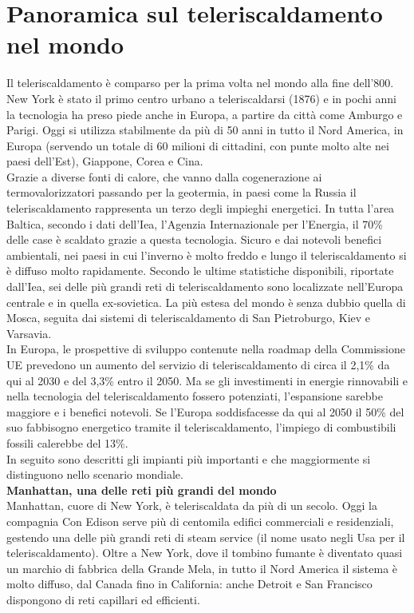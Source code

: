 \documentclass[laurea,oneside,11pt]{USiena_tesiLM}
\begin{document}
\section{Panoramica sul teleriscaldamento nel mondo}
Il teleriscaldamento è comparso per la prima volta nel mondo alla fine dell'800. New York è stato il primo centro urbano a teleriscaldarsi (1876) e in pochi anni la tecnologia ha preso piede anche in Europa, a partire da città come Amburgo e Parigi.
Oggi si utilizza stabilmente da più di 50 anni in tutto il Nord America, in Europa (servendo un totale di 60 milioni di cittadini, con punte molto alte nei paesi dell'Est), Giappone, Corea e Cina.\\

Grazie a diverse fonti di calore, che vanno dalla cogenerazione ai termovalorizzatori passando per la geotermia, in paesi come la Russia il teleriscaldamento rappresenta un terzo degli impieghi energetici. In tutta l'area Baltica, secondo i dati dell'Iea, l'Agenzia Internazionale per l'Energia, il 70\% delle case è scaldato grazie a questa tecnologia. Sicuro e dai notevoli benefici ambientali, nei paesi in cui l'inverno è molto freddo e lungo il teleriscaldamento si è diffuso molto rapidamente. Secondo le ultime statistiche disponibili, riportate dall'Iea, sei delle più grandi reti di teleriscaldamento sono localizzate nell'Europa centrale e in quella ex-sovietica. La più estesa del mondo è senza dubbio quella di Mosca, seguita dai sistemi di teleriscaldamento di San Pietroburgo, Kiev e Varsavia. \\

In Europa, le prospettive di sviluppo contenute nella roadmap della Commissione UE prevedono un aumento del servizio di teleriscaldamento di circa il 2,1\% da qui al 2030 e del 3,3\% entro il 2050. Ma se gli investimenti in energie rinnovabili e nella tecnologia del teleriscaldamento fossero potenziati, l'espansione sarebbe maggiore e i benefici notevoli. Se l'Europa soddisfacesse da qui al 2050 il 50\% del suo fabbisogno energetico tramite il teleriscaldamento, l'impiego di combustibili fossili calerebbe del 13\%.\\

In seguito sono descritti gli impianti più importanti e che maggiormente si distinguono nello scenario mondiale.\\

\noindent\textbf{Manhattan, una delle reti più grandi del mondo}\\
\noindent Manhattan, cuore di New York, è teleriscaldata da più di un secolo. Oggi la compagnia Con Edison serve più di centomila edifici commerciali e residenziali, gestendo una delle più grandi reti di steam service (il nome usato negli Usa per il teleriscaldamento). Oltre a New York, dove il tombino fumante è diventato quasi un marchio di fabbrica della Grande Mela, in tutto il Nord America il sistema è molto diffuso, dal Canada fino in California: anche Detroit e San Francisco dispongono di reti capillari ed efficienti.\\
\end{document}
